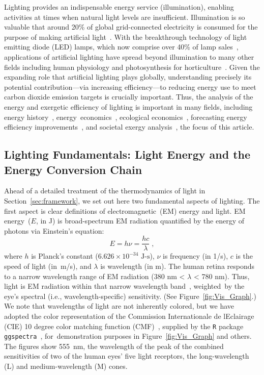 \documentclass[energies,article,accept,moreauthors,pdftex]{Definitions/mdpi}\usepackage[]{graphicx}\usepackage[]{color}
\newcommand{\ins}[1]{#1}
\newcommand{\humaneyesensitivity}{380 nm < $\lambda$ < 780 nm}
\providecommand{\DIFaddbegin}{} %
\providecommand{\DIFaddend}{} %
\newcommand{\DIFaddincludegraphics}[2][]{{\color{blue}\fbox{\DIFOincludegraphics[#1]{#2}}}} %
\DeclareRobustCommand{\DIFaddbegin}{\DIFOaddbegin \let\includegraphics\DIFaddincludegraphics} %
\DeclareRobustCommand{\DIFaddend}{\DIFOaddend \let\includegraphics\DIFOincludegraphics} %
\begin{document}
Lighting provides an indispensable energy service (illumination), 
enabling activities at times when natural light levels are insufficient.
Illumination is so valuable that around 20\% of global grid-connected electricity 
is consumed for the purpose of making artificial light~\cite{waide2006}.
With the breakthrough technology of light emitting diode (LED) lamps,
which now comprise over 40\% of lamp sales~\cite{IEA2020},
applications of artificial lighting have spread beyond illumination to many other fields
including human physiology and photosynthesis for horticulture~\cite{Pattison2018LEDefficacy}.
Given the expanding role that artificial lighting plays globally,
understanding precisely 
its potential contribution---via increasing efficiency---to reducing energy use
to meet carbon dioxide emission targets is crucially important.
Thus, the analysis of the energy and exergetic efficiency of lighting 
is important in many fields, including
energy history~\cite{Fouquet:2006},
\mbox{energy economics~\cite{Nordhaus1996}},
ecological economics~\cite{whiting2020illumination},
forecasting energy efficiency improvements~\cite{IEA2020}, and 
societal exergy analysis~\cite{Ayres2005},
the focus of this article.


\subsection{Lighting Fundamentals: Light Energy and the Energy Conversion Chain}
\label{sec:light_ECC}

Ahead of a detailed treatment of the thermodynamics of light in Section~\ref{sec:framework}, we set out here two fundamental aspects of lighting. 
The first aspect is clear definitions of electromagnetic~(EM) energy and light.
EM energy~($E$, in J) is broad-spectrum EM radiation
quantified by the energy of photons via Einstein's equation:
\begin{equation}
  E = h \nu = \frac{hc}{\lambda} \; ,
\end{equation}
%
where 
$h$ is Planck's constant ($6.626 \times 10^{-34} \text{ J-s}$), 
$\nu$ is frequency (in 1/s),
$c$ is the speed of light (\mbox{in m/s}), and
$\lambda$ is wavelength (in m).
The human retina responds to a narrow wavelength range of EM radiation
(\humaneyesensitivity{}).
Thus, light is EM radiation within that narrow wavelength band~\cite{campbell2017}, 
\mbox{weighted by} the eye's spectral (i.e., wavelength-specific) sensitivity.
(See Figure~\ref{fig:Vis_Graph}.)
\DIFaddbegin \ins{We note that wavelengths of light are not inherently colored, 
but we have adopted the color representation
of the
Commission Internationale de l\textquotesingle{}Eclairage (CIE)
10 degree color matching function (CMF)~\cite{CIE2006},
supplied by the \texttt{R} package \texttt{ggspectra}~\cite{Aphalo2015},
\mbox{for demonstration} purposes
in Figure~\ref{fig:Vis_Graph} 
and others.
The figures show 555~nm, the wavelength of the peak of the combined sensitivities 
of two of the human eyes' five light receptors, 
the long-wavelength (L) and medium-wavelength (M) cones.}%
\DIFaddend 
\end{document}
